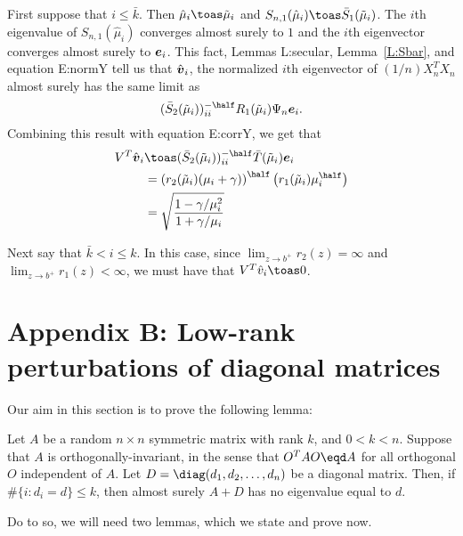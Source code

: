 First suppose that $i \leq \bar k$.  Then $\hat \mu_i \toas \tilde \mu_i$ and
$S_{n,1}(\hat \mu_i) \toas \bar S_1 (\tilde \mu_i)$.  The $i$th eigenvalue
of $S_{n,1} (\hat \mu_i)$ converges almost surely to $1$ and the $i$th
eigenvector converges almost surely to $\boldsymbol{e}_i$.  This fact, 
Lemmas {L:secular}, Lemma~\ref{L:Sbar}, and equation {E:normY} 
tell us that $\hat {\boldsymbol{v}}_i$, the normalized $i$th eigenvector of
$(1/n) X_n^T X_n$ almost surely has the same limit as
\[
    (\bar S_2(\tilde \mu_i))_{ii}^{-\half} R_1(\tilde \mu_i) \Psi_n \be_i.
\]
Combining this result with equation {E:corrY}, we get that
\begin{align*}
    V^T \hat \bv_i
        &\toas
        (\bar S_2(\tilde \mu_i))_{ii}^{-\half} \bar T(\tilde \mu_i) \be_i \\
        &= \left( r_2( \tilde \mu_i ) (\mu_i + \gamma )\right)^\half
           \left( r_1( \tilde \mu_i ) \mu_i^\half \right) \\
        &= \sqrt{
                \frac{ 1 - \gamma/\mu_i^2}
                     { 1 + \gamma/\mu_i  }
           }
\end{align*}

Next say that $\bar k < i \leq k$.  In this case, since 
$\lim_{z \to b^+} r_2(z) = \infty$ and $\lim_{z \to b^+} r_1(z) < \infty$, we must have that  $V^T \hat v_i \toas 0$.

\section*{Appendix B: Low-rank perturbations of diagonal matrices}

Our aim in this section is to prove the following lemma:

\begin{lemma}\label{L:lowrank-perturb}
    Let $A$ be a random $n\times n$ symmetric matrix with rank $k$, and
    $0 < k < n$.  Suppose that $A$ is orthogonally-invariant, in the sense that 
    $O^T A O \eqd A$ for all orthogonal $O$ independent of $A$.  Let
    $D = \diag(d_1, d_2, \ldots, d_n)$ be a diagonal matrix.  Then, if
    $\#\{ i : d_i = d \} \leq k$, then almost surely $A + D$ has no eigenvalue
    equal to $d$.
\end{lemma}

\noindent Do to so, we will need two lemmas, which we state and prove now.

